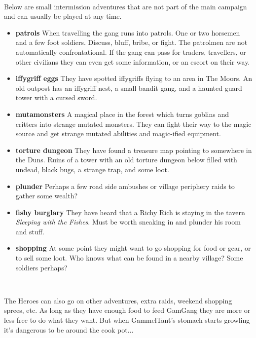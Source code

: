 \

Below are small intermission adventures that are not part of the main campaign and can usually be played at any time.

\begin{itemize}

    \item \textbf{patrols} When travelling the gang runs into patrols. One or two horsemen and a few foot soldiers. Discuss, bluff, bribe, or fight. The patrolmen are not automatically confrontational. If the gang can pass for traders, travellers, or other civilians they can even get some information, or an escort on their way.

    \item \textbf{iffygriff eggs} They have spotted iffygriffs flying to an area in The Moors. An old outpost has an iffygriff nest, a small bandit gang, and a haunted guard tower with a cursed sword.

    \item \textbf{mutamonsters} A magical place in the forest which turns goblins and critters into strange mutated monsters. They can fight their way to the magic source and get strange mutated abilities and magic-ified equipment.

    \item \textbf{torture dungeon} They have found a treasure map pointing to somewhere in the Duns. Ruins of a tower with an old torture dungeon below filled with undead, black bugs, a strange trap, and some loot.

    \item \textbf{plunder} Perhaps a few road side ambushes or village periphery raids to gather some wealth?

    \item \textbf{fishy burglary} They have heard that a Richy Rich is staying in the tavern \emph{Sleeping with the Fishes}. Must be worth sneaking in and plunder his room and stuff.

    \item \textbf{shopping} At some point they might want to go shopping for food or gear, or to sell some loot. Who knows what can be found in a nearby village? Some soldiers perhaps?

\end{itemize}

\

The Heroes can also go on other adventures, extra raids, weekend shopping sprees, etc. As long as they have enough food to feed GamGang they are more or less free to do what they want. But when GammelTant's stomach starts growling it's dangerous to be around the cook pot...


